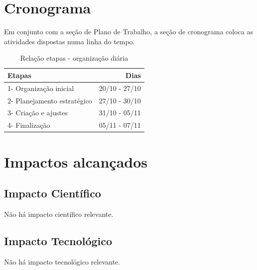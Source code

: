 \documentclass[a4paper,12pt]{article}  %
\begin{document}
\section{Cronograma}

   Em conjunto com a seção de Plano de Trabalho, a seção de cronograma coloca as atividades dispostas numa linha do tempo.


\begin{table}[H]
\begin{center}
 \caption{Relação etapas - organização diária}
\begin{tabular}{|l|r|}
  \hline \hline
  Etapas & Dias  \\ \hline 
  1- Organização inicial &  20/10 - 27/10  \\ \hline
  2- Planejamento estratégico & 27/10 - 30/10 \\ \hline
  3- Criação e ajustes  &  31/10 - 05/11 \\ \hline
  4- Finalização & 05/11 - 07/11 \\ \hline
\end{tabular} 
\end{center}
\end{table}

\section{Impactos alcançados } %

 \subsection{Impacto Científico}

  Não há impacto científico relevante.

 \subsection{Impacto Tecnológico}

   Não há impacto tecnológico relevante.
\end{document}
